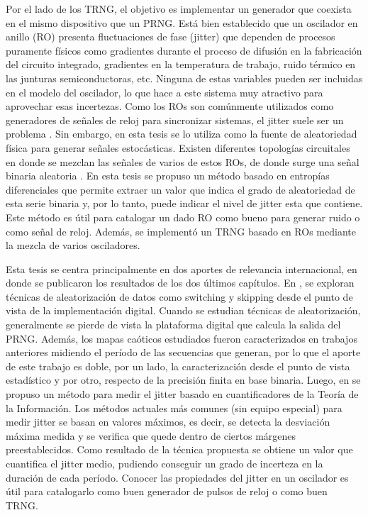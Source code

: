 Por el lado de los TRNG, el objetivo es implementar un generador que coexista en el mismo dispositivo que un PRNG.
Está bien establecido que un oscilador en anillo (RO) presenta fluctuaciones de fase (jitter) que dependen de procesos puramente físicos como gradientes durante el proceso de difusión en la fabricación del circuito integrado, gradientes en la temperatura de trabajo, ruido térmico en las junturas semiconductoras, etc.
Ninguna de estas variables pueden ser incluidas en el modelo del oscilador, lo que hace a este sistema muy atractivo para aprovechar esas incertezas.
Como los ROs son comúnmente utilizados como generadores de señales de reloj para sincronizar sistemas, el jitter suele ser un problema \cite{Baron2012}.
Sin embargo, en esta tesis se lo utiliza como la fuente de aleatoriedad física para generar señales estocásticas.
Existen diferentes topologías circuitales en donde se mezclan las señales de varios de estos ROs, de donde surge una señal binaria aleatoria \cite{Sunar2007}.
En esta tesis se propuso un método basado en entropías diferenciales que permite extraer un valor que indica el grado de aleatoriedad de esta serie binaria y, por lo tanto, puede indicar el nivel de jitter esta que contiene.
Este método es útil para catalogar un dado RO como bueno para generar ruido o como señal de reloj.
Además, se implementó un TRNG basado en ROs mediante la mezcla de varios osciladores.

Esta tesis se centra principalmente en dos aportes de relevancia internacional, en donde se publicaron los resultados de los dos últimos capítulos.
En \cite{Antonelli2018}, se exploran técnicas de aleatorización de datos como switching y skipping desde el punto de vista de la implementación digital.
Cuando se estudian técnicas de aleatorización, generalmente se pierde de vista la plataforma digital que calcula la salida del PRNG.
Además, los mapas caóticos estudiados fueron caracterizados en trabajos anteriores midiendo el período de las secuencias que generan, por lo que el aporte de este trabajo es doble, por un lado, la caracterización desde el punto de vista estadístico y por otro, respecto de la precisión finita en base binaria.
Luego, en \cite{Antonelli2017} se propuso un método para medir el jitter basado en cuantificadores de la Teoría de la Información.
Los métodos actuales más comunes (sin equipo especial) para medir jitter se basan en valores máximos, es decir, se detecta la desviación máxima medida y se verifica que quede dentro de ciertos márgenes preestablecidos.
Como resultado de la técnica propuesta se obtiene un valor que cuantifica el jitter medio, pudiendo conseguir un grado de incerteza en la duración de cada período.
Conocer las propiedades del jitter en un oscilador es útil para catalogarlo como buen generador de pulsos de reloj o como buen TRNG.

